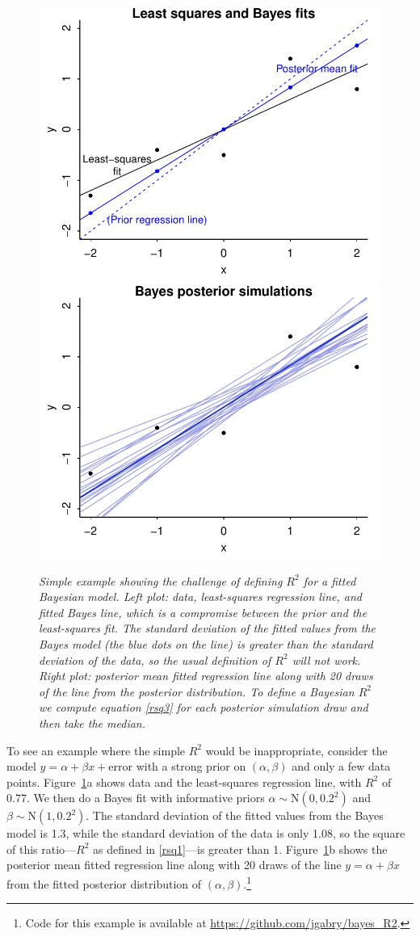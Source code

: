 \documentclass[11pt]{article}
\begin{document}
\begin{figure}
\centerline{\includegraphics[width=.5\textwidth]{fig/rsquared1a.pdf}\includegraphics[width=.5\textwidth]{fig/rsquared1b.pdf}}
\vspace{-.1in}
\caption{\em Simple example showing the challenge of defining $R^2$ for a fitted
Bayesian model.  {\em Left plot:}  data, least-squares regression line, and
fitted Bayes line, which is a compromise between the prior and the least-squares
fit.  The standard deviation of the fitted values from the Bayes model (the blue
dots on the line) is greater than the standard deviation of the data, so the
usual definition of $R^2$ will not work.  {\em Right plot:}  posterior mean
fitted regression line along with 20 draws of the line from the posterior
distribution.  To define a Bayesian $R^2$ we compute equation
\eqref{rsq3} for each posterior simulation draw and then take the median.}
\label{rsquared1}
\end{figure}

To see an example where the simple $R^2$ would be inappropriate, consider the model
$y = \alpha + \beta x+\mbox{error}$
with a strong prior on $(\alpha,\beta)$ and only a few data points.
Figure~\ref{rsquared1}a shows data and the least-squares regression line, with
$R^2$ of 0.77.  We then do a Bayes fit with informative priors
$\alpha \sim \mbox{N}(0,0.2^2)$ and $\beta \sim \mbox{N}(1,0.2^2)$.
The standard deviation of the fitted values from the Bayes model is 1.3, while
the standard deviation of the data is only 1.08, so the square of this
ratio---$R^2$ as defined in \eqref{rsq1}---is greater than 1.
Figure~\ref{rsquared1}b shows the posterior mean fitted regression line along
with 20 draws of the line $y = \alpha + \beta x$ from the fitted posterior
distribution of $(\alpha,\beta)$.\footnote{Code for this example is available at
\url{https://github.com/jgabry/bayes_R2}.}
\end{document}
